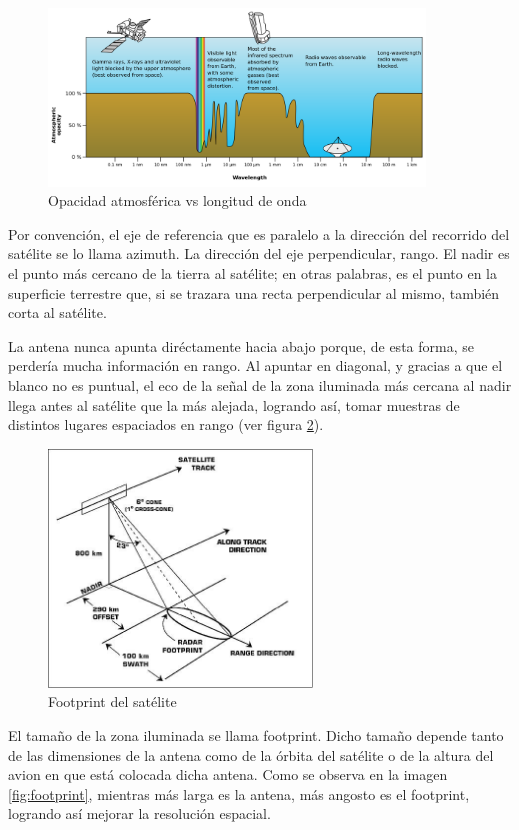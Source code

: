 \begin{figure}[H]
 \centering
 \includegraphics[width=10cm]{gfx/AtmosphericOpacity.png}
 \caption{Opacidad atmosférica vs longitud de onda}
 \label{fig:atmosphere}
\end{figure}

Por convención, el eje de referencia que es paralelo a la dirección del recorrido del satélite se lo llama azimuth. La
dirección del eje perpendicular, rango. El nadir es el punto más cercano de la tierra al satélite; en otras palabras, 
es el punto en la superficie terrestre que, si se trazara una recta perpendicular al mismo, también corta al satélite.

La antena nunca apunta diréctamente hacia abajo porque, de esta forma, se perdería mucha información en rango. Al apuntar 
en diagonal, y gracias a que el blanco no es puntual, el eco de la señal de la zona iluminada más cercana al nadir llega 
antes al satélite que la más alejada, logrando así, tomar muestras de distintos lugares espaciados en rango (ver figura 
\ref{fig:antena_ilumination}).

\begin{figure}[H]
 \centering
 \includegraphics[width=7cm]{gfx/satellite.png}
 \caption{Footprint del satélite}
 \label{fig:antena_ilumination}
\end{figure}

El tamaño de la zona iluminada se llama footprint. Dicho tamaño depende tanto de las dimensiones de la antena como de la 
órbita del satélite o de la altura del avion en que está colocada dicha antena. Como se observa en la imagen 
\ref{fig:footprint}, mientras más larga es la antena, más angosto es el footprint, logrando así mejorar la resolución 
espacial.

